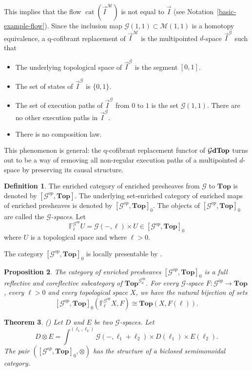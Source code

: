 \documentclass[a4paper,12pt]{amsart}
\newcommand{\p}{\times}
\renewcommand{\vec}{\overrightarrow}
\newtheorem{thm}{Theorem}[section]
\newtheorem{prop}[thm]{Proposition}
\newcommand{\bp}{\begin{prop}}
\newcommand{\ep}{\end{prop}}
\newcommand{\bth}{\begin{thm}}
\renewcommand{\eth}{\end{thm}}
\theoremstyle{definition}
\newtheorem{defn}[thm]{Definition}
\newcommand{\bd}{\begin{defn}}
\newcommand{\ed}{\end{defn}}
\renewcommand{\top}{{\mathbf{Top}}}
\newcommand{\iso}{\cong}
\newcommand{\ot}{\otimes}
\newcommand{\vI}{\vec{I}}
\newcommand{\ptop}[1]{{\brm{{#1}dTop}}}
\newcommand{\brm}[1]{{\rm{\mathbf{#1}}}}
\newcommand{\topdgr}{[\mathcal{G}^{op},\top]}
\DeclareMathOperator{\Cat}{\mathrm{cat}}
\begin{document}
This implies that the flow $\Cat(\vI^{\mathcal{M}})$ is not equal to $\vI$ (see Notation~\ref{basic-example-flow}). Since the inclusion map $\mathcal{G}(1,1) \subset \mathcal{M}(1,1)$ is a homotopy equivalence, a q-cofibrant replacement of $\vI^{\mathcal{M}}$ is the multipointed $d$-space $\vI^{\mathcal{G}}$ such that
\begin{itemize}
	\item The underlying topological space of $\vI^{\mathcal{G}}$ is the segment $[0,1]$.
	\item The set of states of $\vI^{\mathcal{G}}$ is $\{0,1\}$.
	\item The set of execution paths of $\vI^{\mathcal{G}}$ from $0$ to $1$ is the set $\mathcal{G}(1,1)$. There are no other execution paths in $\vI^{\mathcal{G}}$.
	\item There is no composition law.
\end{itemize}
This phenomenon is general: the q-cofibrant replacement functor of $\ptop{\mathcal{G}}$ turns out to be a way of removing all non-regular execution paths of a multipointed $d$-space by preserving its causal structure.


\bd \label{gspace}
The enriched category of enriched presheaves from $\mathcal{G}$ to $\top$ is denoted by $\topdgr$. The underlying set-enriched category of enriched maps of enriched presheaves is denoted by $\topdgr_0$. The objects of $\topdgr_0$ are called the \textit{$\mathcal{G}$-spaces}. Let \[\mathbb{F}^{\mathcal{G}^{op}}_{\ell}U=\mathcal{G}(-,\ell)\p U \in \topdgr_0\] where $U$ is a topological space and where $\ell>0$.
\ed

The category $\topdgr_0$ is locally presentable by \cite[Proposition~5.1]{dgrtop}. 

\bp\label{ev-adj} \cite[Proposition~5.3 and Proposition~5.5]{dgrtop}
The category of enriched presheaves $\topdgr_0$ is a full reflective and coreflective subcategory of $\top^{\mathcal{G}^{op}_0}$.  For every $\mathcal{G}$-space $F:\mathcal{G}^{op}\to \top$, every $\ell>0$ and every topological space $X$, we have the natural bijection of sets \[\topdgr_0(\mathbb{F}^{\mathcal{G}^{op}}_{\ell}X,F) \iso \top(X,F(\ell)).\] 
\ep


\bth (\cite[Theorem~5.14]{Moore1}) \label{closedsemimonoidal}
Let $D$ and $E$ be two $\mathcal{G}$-spaces. Let 
\[
D \ot E = \int^{(\ell_1,\ell_2)} \mathcal{G}(-,\ell_1+\ell_2) \p D(\ell_1) \p E(\ell_2).
\]
The pair $(\topdgr_0,\ot)$ has the structure of a biclosed semimonoidal category.
\eth
\end{document}

